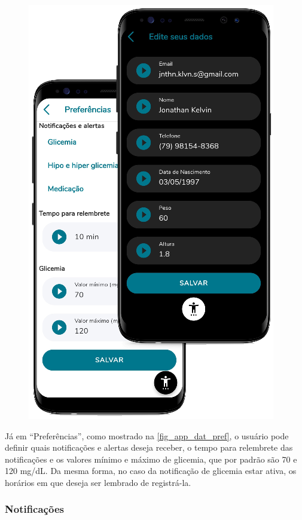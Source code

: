\begin{figure}[htb]
\begin{minipage}{0.53\textwidth}
        \includegraphics[scale=0.56]{Imagens/desenvolvimento/app/app_dat_pref.png}
    \end{minipage}
\end{figure}

Já em “Preferências”, como mostrado na \autoref{fig_app_dat_pref}, o usuário pode definir quais notificações
e alertas deseja receber, o tempo para relembrete das notificações e os valores mínimo e máximo de glicemia,
que por padrão são 70 e 120 mg/dL. Da mesma forma, no caso da notificação de glicemia estar ativa, os horários em
que deseja ser lembrado de registrá-la.

\newpage

\subsubsection{Notificações}

